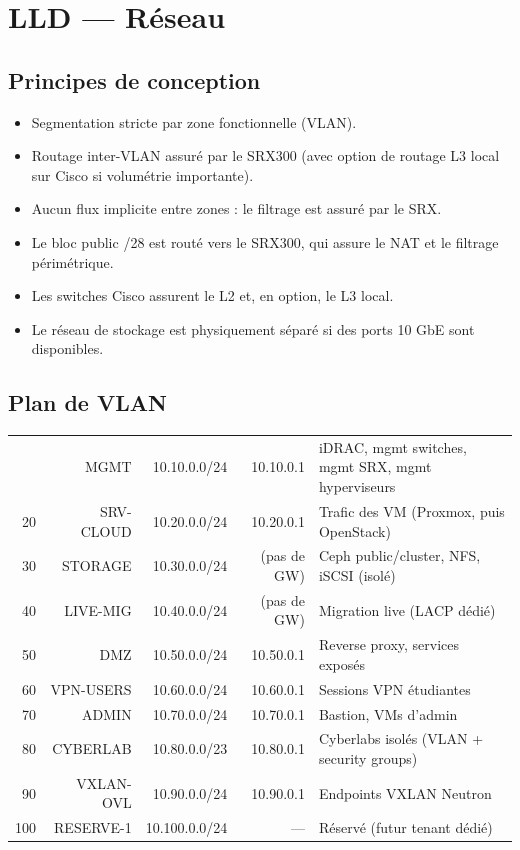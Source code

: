 \chapter{LLD — Réseau}
\label{chap:reseau}

\section{Principes de conception}
\begin{itemize}
  \item Segmentation stricte par zone fonctionnelle (VLAN).
  \item Routage inter-VLAN assuré par le SRX300 (avec option de routage L3 local sur Cisco si volumétrie importante).
  \item Aucun flux implicite entre zones : le filtrage est assuré par le SRX.
  \item Le bloc public /28 est routé vers le SRX300, qui assure le NAT et le filtrage périmétrique.
  \item Les switches Cisco assurent le L2 et, en option, le L3 local.
  \item Le réseau de stockage est physiquement séparé si des ports 10 GbE sont disponibles.
\end{itemize}

\section{Plan de VLAN}
\begin{xltabular}{\textwidth}{@{}rrrrX@{}}
\toprule
{} &  &  &  &  \\
\midrule
\endhead
\bottomrule
\endfoot
\bottomrule
{}  & MGMT       & 10.10.0.0/24  & 10.10.0.1  & iDRAC, mgmt switches, mgmt SRX, mgmt hyperviseurs \\
20  & SRV-CLOUD  & 10.20.0.0/24  & 10.20.0.1  & Trafic des VM (Proxmox, puis OpenStack) \\
30  & STORAGE    & 10.30.0.0/24  & (pas de GW) & Ceph public/cluster, NFS, iSCSI (isolé) \\
40  & LIVE-MIG   & 10.40.0.0/24  & (pas de GW) & Migration live (LACP dédié) \\
50  & DMZ        & 10.50.0.0/24  & 10.50.0.1  & Reverse proxy, services exposés \\
60  & VPN-USERS  & 10.60.0.0/24  & 10.60.0.1  & Sessions VPN étudiantes \\
70  & ADMIN      & 10.70.0.0/24  & 10.70.0.1  & Bastion, VMs d'admin \\
80  & CYBERLAB   & 10.80.0.0/23  & 10.80.0.1  & Cyberlabs isolés (VLAN + security groups) \\
90  & VXLAN-OVL  & 10.90.0.0/24  & 10.90.0.1  & Endpoints VXLAN Neutron \\
100 & RESERVE-1  & 10.100.0.0/24 & —          & Réservé (futur tenant dédié) \\

\end{xltabular}

